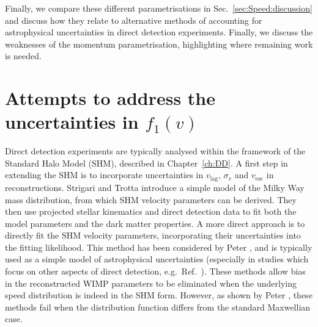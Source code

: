
Finally, we compare these different parametrisations in Sec.~\ref{sec:Speed:discussion} and discuss how they relate to alternative methods of accounting for astrophysical uncertainties in direct detection experiments. Finally, we discuss the weaknesses of the momentum parametrisation, highlighting where remaining work is needed.

\section{Attempts to address the uncertainties in $f_1(v)$}
\label{sec:Speed:attempts}

Direct detection experiments are typically analysed within the framework of the Standard Halo Model (SHM), described in Chapter~\ref{ch:DD}. A first step in extending the SHM is to incorporate uncertainties in $v_\textrm{lag}$, $\sigma_v$ and $v_\textrm{esc}$ in reconstructions. Strigari and Trotta \cite{Strigari:2009} introduce a simple model of the Milky Way mass distribution, from which SHM velocity parameters can be derived. They then use projected stellar kinematics and direct detection data to fit both the model parameters and the dark matter properties. A more direct approach is to directly fit the SHM velocity parameters, incorporating their uncertainties into the fitting likelihood. This method has been considered by Peter \cite{Peter:2010}, and is typically used as a simple model of astrophysical uncertainties (especially in studies which focus on other aspects of direct detection, e.g.\ Ref.~\cite{Arina:2013}). These methods allow bias in the reconstructed WIMP parameters to be eliminated when the underlying speed distribution is indeed in the SHM form. However, as shown by Peter \cite{Peter:2011}, these methods fail when the distribution function differs from the standard Maxwellian case.

